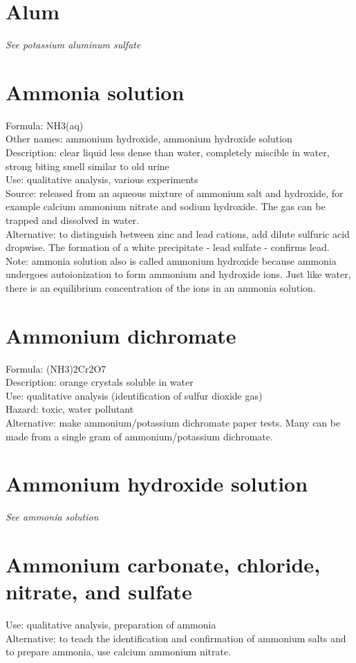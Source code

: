 \section{Alum}
\textit{See potassium aluminum sulfate}

\section{Ammonia solution}
Formula: NH3(aq)\\
Other names: ammonium hydroxide, 
ammonium hydroxide solution\\
Description: clear liquid less dense than water, 
completely miscible in water, 
strong biting smell similar to old urine\\
Use: qualitative analysis, various experiments\\
Source: released from an aqueous mixture of ammonium salt and hydroxide, 
for example calcium ammonium nitrate and sodium hydroxide. 
The gas can be trapped and dissolved in water.\\
Alternative: to distinguish between zinc and lead cations, 
add dilute sulfuric acid dropwise. 
The formation of a white precipitate - lead sulfate - confirms lead.
Note: ammonia solution also is called ammonium hydroxide 
because ammonia undergoes autoionization to form ammonium and hydroxide ions. 
Just like water, 
there is an equilibrium concentration of the ions in an ammonia solution.

\section{Ammonium dichromate}
Formula: (NH3)2Cr2O7\\
Description: orange crystals soluble in water\\
Use: qualitative analysis (identification of sulfur dioxide gas)\\
Hazard: toxic, 
water pollutant\\
Alternative: make ammonium/potassium dichromate paper tests. 
Many can be made from a single gram of ammonium/potassium dichromate.

\section{Ammonium hydroxide solution}
\textit{See ammonia solution}

\section{Ammonium carbonate, chloride, nitrate, and sulfate}
Use: qualitative analysis, 
preparation of ammonia\\
Alternative: to teach the identification 
and confirmation of ammonium salts and to prepare ammonia, 
use calcium ammonium nitrate.

